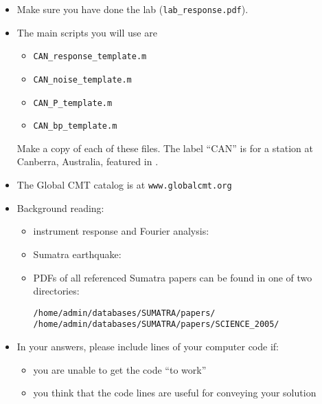 \documentclass[11pt,titlepage,fleqn]{article}
\begin{document}
\begin{itemize}

\item Make sure you have done the lab (\verb+lab_response.pdf+).


\item The main scripts you will use are
%
\begin{itemize}
\item \verb+CAN_response_template.m+
\item \verb+CAN_noise_template.m+
\item \verb+CAN_P_template.m+
\item \verb+CAN_bp_template.m+
\end{itemize}
%
Make a copy of each of these files. The label ``CAN'' is for a station at Canberra, Australia, featured in \citet[][Figure~1]{Park2005}.


\item The Global CMT catalog is at \verb+www.globalcmt.org+


\item Background reading:

\begin{itemize}
\item instrument response and Fourier analysis: \citet[][Ch.~6]{SteinWysession}
\item Sumatra earthquake: \citep{Lay2005,Ammon2005,Park2005,Ni2005}
\item PDFs of all referenced Sumatra papers can be found in one of two directories:
%
\begin{verbatim}
/home/admin/databases/SUMATRA/papers/
/home/admin/databases/SUMATRA/papers/SCIENCE_2005/
\end{verbatim}

\end{itemize}


\item In your answers, please include lines of your computer code if:
%
\begin{itemize}
\item you are unable to get the code ``to work''
\item you think that the code lines are useful for conveying your solution
\end{itemize}

\end{itemize}
\end{document}
